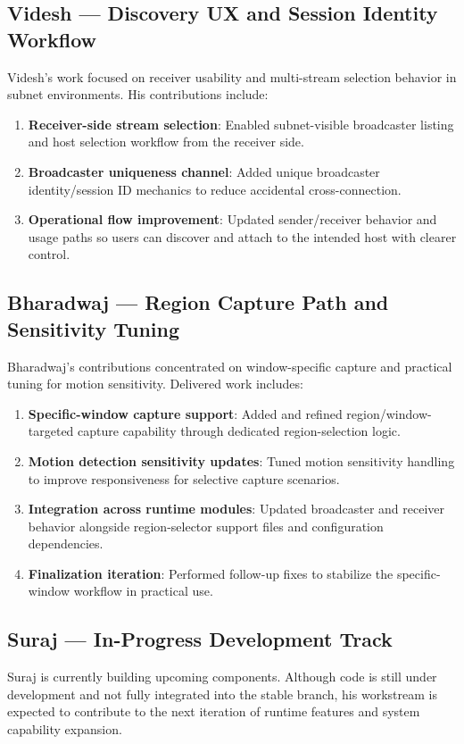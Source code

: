 \documentclass[12pt,a4paper]{article}
\begin{document}
\subsection{Videsh --- Discovery UX and Session Identity Workflow}
Videsh's work focused on receiver usability and multi-stream selection behavior in subnet environments. His contributions include:
\begin{enumerate}[label=\textbf{\arabic*.}, itemsep=6pt]
  \item \textbf{Receiver-side stream selection}: Enabled subnet-visible broadcaster listing and host selection workflow from the receiver side.
  \item \textbf{Broadcaster uniqueness channel}: Added unique broadcaster identity/session ID mechanics to reduce accidental cross-connection.
  \item \textbf{Operational flow improvement}: Updated sender/receiver behavior and usage paths so users can discover and attach to the intended host with clearer control.
\end{enumerate}

\subsection{Bharadwaj --- Region Capture Path and Sensitivity Tuning}
Bharadwaj's contributions concentrated on window-specific capture and practical tuning for motion sensitivity. Delivered work includes:
\begin{enumerate}[label=\textbf{\arabic*.}, itemsep=6pt]
  \item \textbf{Specific-window capture support}: Added and refined region/window-targeted capture capability through dedicated region-selection logic.
  \item \textbf{Motion detection sensitivity updates}: Tuned motion sensitivity handling to improve responsiveness for selective capture scenarios.
  \item \textbf{Integration across runtime modules}: Updated broadcaster and receiver behavior alongside region-selector support files and configuration dependencies.
  \item \textbf{Finalization iteration}: Performed follow-up fixes to stabilize the specific-window workflow in practical use.
\end{enumerate}

\subsection{Suraj --- In-Progress Development Track}
Suraj is currently building upcoming components. Although code is still under development and not fully integrated into the stable branch, his workstream is expected to contribute to the next iteration of runtime features and system capability expansion.
\end{document}
